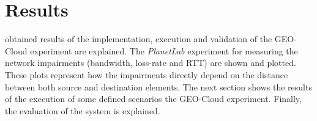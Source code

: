 \chapter{Results}
\label{chap:results}

 obtained results of the implementation, execution and
validation of the GEO-Cloud experiment are explained. The \emph{PlanetLab}
experiment for measuring the network impairments (bandwidth, loss-rate and
\ac{RTT}) are shown and plotted. These plots represent how the impairments
directly depend on the distance between both source and destination elements.
The next section shows the results of the execution of some defined scenarios
the GEO-Cloud experiment. Finally, the evaluation of the system is explained.





